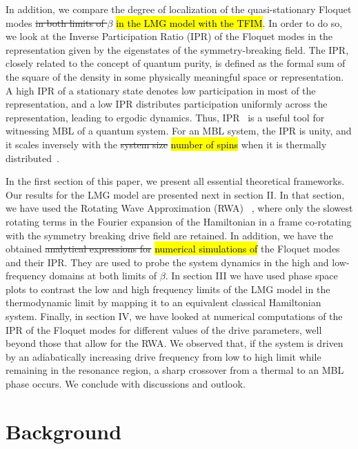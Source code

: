 \documentclass[%
reprint,
superscriptaddress,
linenumbers,
amsmath,amssymb,
aps,
prb,
showkeys,
]{revtex4-2}
\begin{document}
	In addition, we compare the degree of localization of the quasi-stationary Floquet modes \st{in both limits of $\beta$} \hl{in the LMG model with the TFIM}. In order to do so, we look at the Inverse Participation Ratio (IPR) of the Floquet modes in the representation given by the eigenstates of the symmetry-breaking field. The IPR, closely related to the concept of quantum purity, is defined as the formal sum of the square of the density in some physically meaningful space or representation. A high IPR of a stationary state denotes low participation in most of the representation, and a low IPR distributes participation uniformly across the representation, leading to ergodic dynamics\cite{vu_fermionic_2022}. Thus, IPR~\cite{Misguich2016} is a useful tool for witnessing MBL of a quantum system. For an MBL system, the IPR is unity, and it scales inversely with the \st{system size} \hl{number of spins} when it is thermally distributed~\cite{calixto_inverse_2015}.
	
	In the first section of this paper, we present all essential theoretical frameworks. Our results for the LMG model are presented next in section II. In that section, we have used the Rotating Wave Approximation (RWA) ~\cite{fujii_introduction_2017}, where only the slowest rotating terms in the Fourier expansion of the Hamiltonian in a frame co-rotating with the symmetry breaking drive field are retained. In addition, we have the obtained \st{analytical expressions for} \hl{numerical simulations of} the Floquet modes and their IPR. They are used to probe the system dynamics in the high and low-frequency domains at both limits of $\beta$. In section III we have used phase space plots to contrast the low and high frequency limits of the LMG model in the thermodynamic limit by mapping it to an equivalent classical Hamiltonian system. Finally, in section IV, we have looked at numerical computations of the IPR of the Floquet modes for different values of the drive parameters, well beyond those that allow for the RWA. We observed that, if the system is driven by an adiabatically increasing drive frequency from low to high limit while remaining in the resonance region, a sharp crossover from a thermal to an MBL phase occurs. We conclude with discussions and outlook.
	
\section{\label{sec:background} Background}
	
\end{document}
